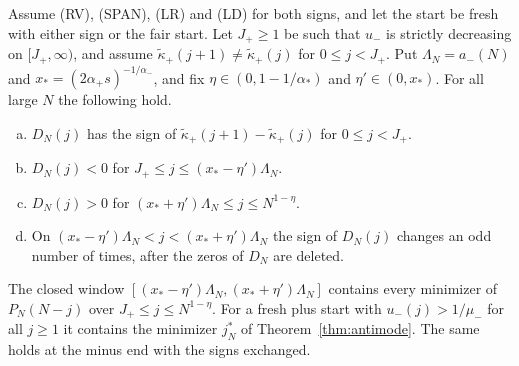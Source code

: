 \begin{theorem}\label{thm:ends}
Assume (RV), (SPAN), (LR) and (LD) for both signs, and let the start be fresh with either
sign or the fair start. Let $J_\plus\ge1$ be such that $u_\minus$ is strictly decreasing on
$[J_\plus,\infty)$, and assume $\widetilde\kappa_\plus(j+1)\ne\widetilde\kappa_\plus(j)$ for
$0\le j<J_\plus$. Put $\Lambda_N=a_\minus(N)$ and $x_*=(2\alpha_\plus s)^{-1/\alpha_\minus}$, and
fix $\eta\in(0,1-1/\alpha_*)$ and $\eta'\in(0,x_*)$. For all large $N$ the following hold.
\begin{enumerate}[(a)]
\item $D_N(j)$ has the sign of $\widetilde\kappa_\plus(j+1)-\widetilde\kappa_\plus(j)$ for
$0\le j<J_\plus$.
\item $D_N(j)<0$ for $J_\plus\le j\le(x_*-\eta')\Lambda_N$.
\item $D_N(j)>0$ for $(x_*+\eta')\Lambda_N\le j\le N^{1-\eta}$.
\item On $(x_*-\eta')\Lambda_N<j<(x_*+\eta')\Lambda_N$ the sign of $D_N(j)$ changes an odd
number of times, after the zeros of $D_N$ are deleted.
\end{enumerate}
The closed window $[(x_*-\eta')\Lambda_N,(x_*+\eta')\Lambda_N]$ contains every minimizer
of $P_N(N-j)$ over $J_\plus\le j\le N^{1-\eta}$. For a fresh plus start with
$u_\minus(j)>1/\mu_\minus$ for all $j\ge1$ it contains the minimizer $j^*_N$ of
Theorem~\ref{thm:antimode}. The same holds at the minus end with the
signs exchanged.
\end{theorem}


